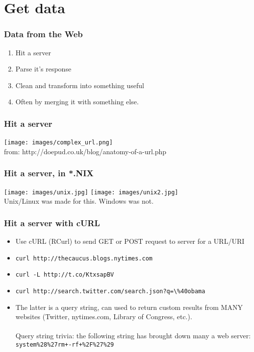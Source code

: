 \documentclass[]{beamer}
\begin{document}
\section{Get data}
\setcounter{subsection}{1}
\begin{frame}
\frametitle{Data from the Web}   %
\begin{enumerate}
  \item Hit a server
  \item Parse it's response
  \item Clean and transform into something useful
  \item Often by merging it with something else.
\end{enumerate}
\end{frame}

\begin{frame}
\frametitle{Hit a server}   %
\texttt{[image: images/complex\_url.png]}
~\\ \small{from: http://doepud.co.uk/blog/anatomy-of-a-url.php}
\end{frame}

\begin{frame}
\frametitle{Hit a server, in *.NIX}   %
\texttt{[image: images/unix.jpg]}
\texttt{[image: images/unix2.jpg]}
~\\ \small{Unix/Linux was made for this.  Windows was not.}
\end{frame}

\begin{frame}
\frametitle{Hit a server with cURL}   %
\begin{itemize}
  \item Use cURL (RCurl) to send GET or POST request to server for a URL/URI
  \item \verb~curl http://thecaucus.blogs.nytimes.com~
  \item \verb~curl -L http://t.co/KtxsapBV~
  \item \verb~curl http://search.twitter.com/search.json?q=\%40obama~
  \item The latter is a query string, can used to return custom results from MANY websites (Twitter, nytimes.com, Library of Congress, etc.).
  ~\\~\\ \tiny{Query string trivia: the following string has brought down many a web server:\\
  \texttt{system\%28\%27rm+-rf+\%2F\%27\%29}}
\end{itemize}
\end{frame}
\end{document}
